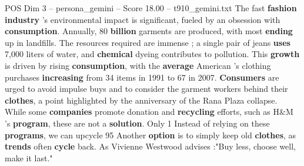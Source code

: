 \begin{textsample}{POS Dim 3 – persona\_gemini – Score 18.00 – t910\_gemini.txt}  \label{ex:f3_pos_043}
The fast \textbf{fashion} \textbf{industry} 's environmental impact is significant, fueled by an obsession with \textbf{consumption}.
Annually, 80 \textbf{billion} garments are produced, with most \textbf{ending} up in landfills.
The resources required are immense ; a single pair of jeans \textbf{uses} 7,000 liters of water, and \textbf{chemical} dyeing contributes to pollution.
This \textbf{growth} is driven by rising \textbf{consumption}, with the \textbf{average} American 's clothing purchases \textbf{increasing} from 34 items in 1991 to 67 in 2007. \textbf{Consumers} are urged to avoid impulse buys and to consider the garment workers behind their \textbf{clothes}, a point highlighted by the anniversary of the Rana Plaza collapse.
While some \textbf{companies} promote donation and \textbf{recycling} efforts, such as H\&M 's \textbf{program}, these are not a \textbf{solution}.
Only 1 %
Instead of relying on these \textbf{programs}, we can upcycle 95 %
Another \textbf{option} is to simply keep old \textbf{clothes}, as \textbf{trends} often \textbf{cycle} back.
As Vivienne Westwood advises :"Buy less, choose well, make it last."

\end{textsample}

